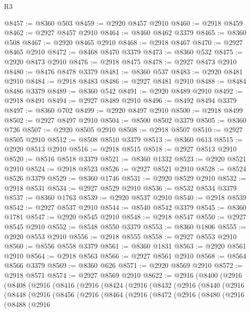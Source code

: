 \begin{lexlean}{R3}
\begin{coremodule}
@8457 := @8360 @503
@8459 := @2920 @8457 @2910
@8460 := @2918 @8459
@8462 := @2927 @8457 @2910
@8464 := @8460 @8462 @3379
@8465 := @8360 @508
@8467 := @2920 @8465 @2910
@8468 := @2918 @8467
@8470 := @2927 @8465 @2910
@8472 := @8468 @8470 @3379
@8473 := @8360 @532
@8475 := @2920 @8473 @2910
@8476 := @2918 @8475
@8478 := @2927 @8473 @2910
@8480 := @8476 @8478 @3379
@8481 := @8360 @537
@8483 := @2920 @8481 @2910
@8484 := @2918 @8483
@8486 := @2927 @8481 @2910
@8488 := @8484 @8486 @3379
@8489 := @8360 @542
@8491 := @2920 @8489 @2910
@8492 := @2918 @8491
@8494 := @2927 @8489 @2910
@8496 := @8492 @8494 @3379
@8497 := @8360 @702
@8499 := @2920 @8497 @2910
@8500 := @2918 @8499
@8502 := @2927 @8497 @2910
@8504 := @8500 @8502 @3379
@8505 := @8360 @726
@8507 := @2920 @8505 @2910
@8508 := @2918 @8507
@8510 := @2927 @8505 @2910
@8512 := @8508 @8510 @3379
@8513 := @8360 @613
@8515 := @2920 @8513 @2910
@8516 := @2918 @8515
@8518 := @2927 @8513 @2910
@8520 := @8516 @8518 @3379
@8521 := @8360 @1332
@8523 := @2920 @8521 @2910
@8524 := @2918 @8523
@8526 := @2927 @8521 @2910
@8528 := @8524 @8526 @3379
@8529 := @8360 @1746
@8531 := @2920 @8529 @2910
@8532 := @2918 @8531
@8534 := @2927 @8529 @2910
@8536 := @8532 @8534 @3379
@8537 := @8360 @1763
@8539 := @2920 @8537 @2910
@8540 := @2918 @8539
@8542 := @2927 @8537 @2910
@8544 := @8540 @8542 @3379
@8545 := @8360 @1781
@8547 := @2920 @8545 @2910
@8548 := @2918 @8547
@8550 := @2927 @8545 @2910
@8552 := @8548 @8550 @3379
@8553 := @8360 @1806
@8555 := @2920 @8553 @2910
@8556 := @2918 @8555
@8558 := @2927 @8553 @2910
@8560 := @8556 @8558 @3379
@8561 := @8360 @1831
@8563 := @2920 @8561 @2910
@8564 := @2918 @8563
@8566 := @2927 @8561 @2910
@8568 := @8564 @8566 @3379
@8569 := @8360 @626
@8571 := @2920 @8569 @2910
@8572 := @2918 @8571
@8574 := @2927 @8569 @2910
@8622 := @2916
    (@8400
      (@2916
        (@8408
          (@2916
            (@8416
              (@2916
                (@8424
                  (@2916
                    (@8432
                      (@2916
                        (@8440
                          (@2916
                            (@8448
                              (@2916
                                (@8456
                                  (@2916
                                    (@8464
                                      (@2916
                                        (@8472
                                          (@2916
                                            (@8480
                                              (@2916
                                                (@8488
                                                  (@2916

\end{coremodule}
\end{lexlean}
